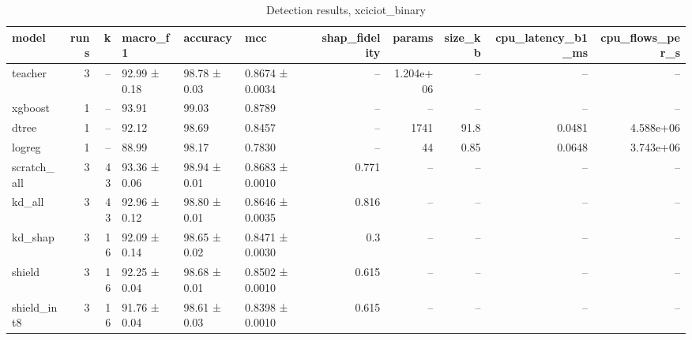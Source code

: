 \begin{table}
\caption{Detection results, xciciot_binary}
\begin{tabular}{lrrlllrrrrr}
\toprule
model & runs & k & macro_f1 & accuracy & mcc & shap_fidelity & params & size_kb & cpu_latency_b1_ms & cpu_flows_per_s \\
\midrule
teacher & 3 & -- & 92.99 ± 0.18 & 98.78 ± 0.03 & 0.8674 ± 0.0034 & -- & 1.204e+06 & -- & -- & -- \\
xgboost & 1 & -- & 93.91 & 99.03 & 0.8789 & -- & -- & -- & -- & -- \\
dtree & 1 & -- & 92.12 & 98.69 & 0.8457 & -- & 1741 & 91.8 & 0.0481 & 4.588e+06 \\
logreg & 1 & -- & 88.99 & 98.17 & 0.7830 & -- & 44 & 0.85 & 0.0648 & 3.743e+06 \\
scratch_all & 3 & 43 & 93.36 ± 0.06 & 98.94 ± 0.01 & 0.8683 ± 0.0010 & 0.771 & -- & -- & -- & -- \\
kd_all & 3 & 43 & 92.96 ± 0.12 & 98.80 ± 0.01 & 0.8646 ± 0.0035 & 0.816 & -- & -- & -- & -- \\
kd_shap & 3 & 16 & 92.09 ± 0.14 & 98.65 ± 0.02 & 0.8471 ± 0.0030 & 0.3 & -- & -- & -- & -- \\
shield & 3 & 16 & 92.25 ± 0.04 & 98.68 ± 0.01 & 0.8502 ± 0.0010 & 0.615 & -- & -- & -- & -- \\
shield_int8 & 3 & 16 & 91.76 ± 0.04 & 98.61 ± 0.03 & 0.8398 ± 0.0010 & 0.615 & -- & -- & -- & -- \\
\bottomrule
\end{tabular}
\end{table}
